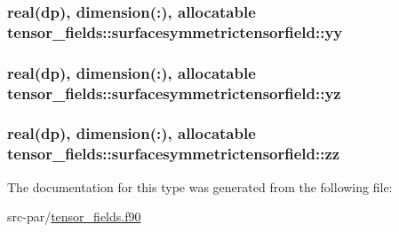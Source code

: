 \hypertarget{structtensor__fields_1_1surfacesymmetrictensorfield_a0aaf3f8a01f551064ea3406e045592e9}{
\subsubsection[{yy}]{\setlength{\rightskip}{0pt plus 5cm}real(dp), dimension(\-:), allocatable tensor\-\_\-fields\-::surfacesymmetrictensorfield\-::yy}}\label{structtensor__fields_1_1surfacesymmetrictensorfield_a0aaf3f8a01f551064ea3406e045592e9}
\hypertarget{structtensor__fields_1_1surfacesymmetrictensorfield_a0f7d63dcfbf20e2d3216121730e4e8ab}{
\subsubsection[{yz}]{\setlength{\rightskip}{0pt plus 5cm}real(dp), dimension(\-:), allocatable tensor\-\_\-fields\-::surfacesymmetrictensorfield\-::yz}}\label{structtensor__fields_1_1surfacesymmetrictensorfield_a0f7d63dcfbf20e2d3216121730e4e8ab}
\hypertarget{structtensor__fields_1_1surfacesymmetrictensorfield_a9ae96b1722f526d905d18bd4449b3800}{
\subsubsection[{zz}]{\setlength{\rightskip}{0pt plus 5cm}real(dp), dimension(\-:), allocatable tensor\-\_\-fields\-::surfacesymmetrictensorfield\-::zz}}\label{structtensor__fields_1_1surfacesymmetrictensorfield_a9ae96b1722f526d905d18bd4449b3800}


The documentation for this type was generated from the following file\-:\begin{DoxyCompactItemize}
\item 
src-\/par/\hyperlink{tensor__fields_8f90}{tensor\-\_\-fields.\-f90}\end{DoxyCompactItemize}
